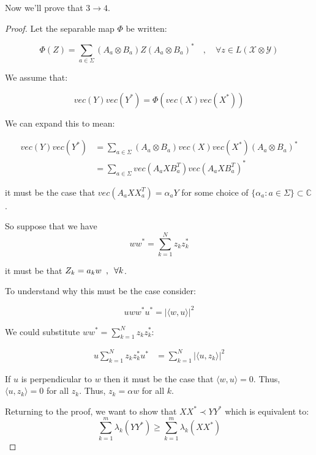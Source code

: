 \documentclass{article}
\begin{document}
Now we'll prove that $3 \rightarrow 4$.

\begin{proof}

    Let the separable map $ \Phi $ be written:

    \[ 
        \Phi(Z) = \sum_{a \in \Sigma} \left( A_a \otimes B_a \right) Z \left(
        A_a \otimes B_a \right)^*  \quad,\quad \forall z\in L(\mathcal{X}\otimes
        \mathcal{Y})
    \]

    We assume that:

    \[ 
        vec(Y)vec(Y^*) = \Phi(vec(X)vec(X^*)) 
    \]
    
    We can expand this to mean:

    \begin{align*}
        vec(Y)vec(Y^*) &= \sum_{a\in\Sigma} \left( A_a \otimes B_a \right)
        vec(X)vec(X^*) \left( A_a \otimes B_a \right)^* \\
        &= \sum_{a\in\Sigma} vec(A_a X B_a^T) vec(A_a X B_a^T)^*
    \end{align*}

    it must be the case that $vec(A_a X X_a^T) = \alpha_a Y$ for some
    choice of $\{ \alpha_a : a \in \Sigma\} \subset \mathbb{C}$.

    So suppose that we have 
    \[ 
        w w^* = \sum_{k=1}^N z_k z_k^* 
    \]
    
    it must be that $ Z_k = a_k w \enskip,\enskip \forall k $.

    To understand why this must be the case consider:

    \[ 
        u w w^* u^* = \left| \langle w , u \rangle \right|^2
    \]
    
    We could substitute $ ww^* = \sum_{k=1}^N z_k z_k^*$:

    \begin{align*}
        u \sum_{k=1}^N z_k z_k^* u^* &= \sum_{k=1}^N \left| \langle u , z_k
    \rangle \right|^2	
    \end{align*}
    
    If $ u $ is perpendicular to $w$ then it must be the case that $\langle w ,
    u \rangle = 0$. Thus, $ \langle u , z_k \rangle = 0$ for all $z_k$. Thus,
    $z_k = \alpha w$ for all $k$.

    Returning to the proof, we want to show that $XX^* \prec YY^*$ which is
    equivalent to:
    \[ 
        \sum_{k=1}^m \lambda_k \left( YY^* \right) \ge \sum_{k=1}^m \lambda_k
        \left( X X^* \right)
    \]
    

\end{proof}
\end{document}
